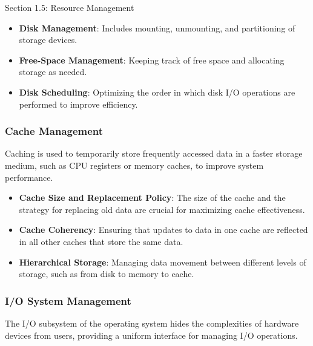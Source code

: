 \begin{notes}{Section 1.5: Resource Management}
    \begin{highlight}
    
    \begin{itemize}
        \item \textbf{Disk Management}: Includes mounting, unmounting, and partitioning of storage devices.
        \item \textbf{Free-Space Management}: Keeping track of free space and allocating storage as needed.
        \item \textbf{Disk Scheduling}: Optimizing the order in which disk I/O operations are performed to improve efficiency.
    \end{itemize}
    
    \end{highlight}
    
    \subsubsection*{Cache Management}
    
    Caching is used to temporarily store frequently accessed data in a faster storage medium, such as CPU registers or memory caches, to improve system performance.
    
    \begin{highlight}
    
    \begin{itemize}
        \item \textbf{Cache Size and Replacement Policy}: The size of the cache and the strategy for replacing old data are crucial for maximizing cache effectiveness.
        \item \textbf{Cache Coherency}: Ensuring that updates to data in one cache are reflected in all other caches that store the same data.
        \item \textbf{Hierarchical Storage}: Managing data movement between different levels of storage, such as from disk to memory to cache.
    \end{itemize}
    
    \end{highlight}
    
    \subsubsection*{I/O System Management}
    
    The I/O subsystem of the operating system hides the complexities of hardware devices from users, providing a uniform interface for managing I/O operations.
    

\end{notes}
